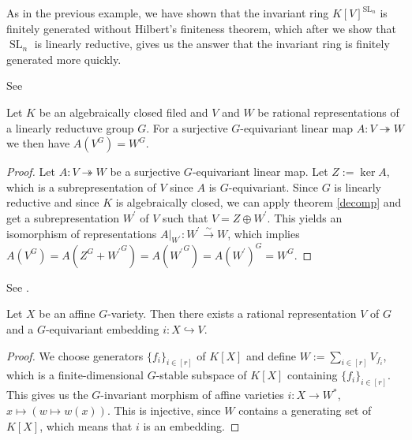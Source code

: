   As in the previous example, we have shown that the invariant ring $K[V]^{\operatorname{SL}_n}$ is finitely generated without Hilbert's finiteness theorem, which after we show that $\operatorname{SL}_n$ is linearly reductive, gives us the answer that the invariant ring is finitely generated more quickly.

\begin{lemma}\label{bloblo}
  See \cite[2.2.8]{DK15}

  Let $K$ be an algebraically closed filed and $V$ and $W$ be rational representations of a linearly reductuve group $G$.
  For a surjective $G$-equivariant linear map $A \colon V \twoheadrightarrow W$ we then have $A(V^G) = W^G$.
\end{lemma}

\begin{proof}
  Let $A \colon V \twoheadrightarrow W$ be a surjective $G$-equivariant linear map.
  Let $Z := \operatorname{ker}A$, which is a subrepresentation of $V$ since $A$ is $G$-equivariant.
  Since $G$ is linearly reductive and since $K$ is algebraically closed, we can apply theorem \ref{decomp} and get a subrepresentation $W^\prime$ of $V$ such that $V = Z \oplus W^\prime$.
  This yields an isomorphism of representations $\left. A \right|_{W^\prime} \colon W^\prime \xrightarrow{\sim} W$, which implies $A(V^G) = A(Z^G + {W^\prime}^G) = A({W^\prime}^G) = A(W^\prime)^G = W^G$.
\end{proof}

\begin{lemma}\label{emb}
  See \cite[A1.9]{DK15}.
  
  Let $X$ be an affine $G$-variety.
  Then there exists a rational representation $V$ of $G$ and a $G$-equivariant embedding $i \colon X \hookrightarrow V$.
\end{lemma}



\begin{proof}
  We choose generators $\{f_i\}_{i \in [r]}$ of $K[X]$ and define $W := \sum_{i \in [r]} V_{f_i}$, which is a finite-dimensional $G$-stable subspace of $K[X]$ containing $\{f_i\}_{i \in [r]}$.
  This gives us the $G$-invariant morphism of affine varieties $i \colon X \rightarrow W^\ast$, $x \mapsto (w \mapsto w(x))$.
  This is injective, since $W$ contains a generating set of $K[X]$, which means that $i$ is an embedding.
\end{proof}

